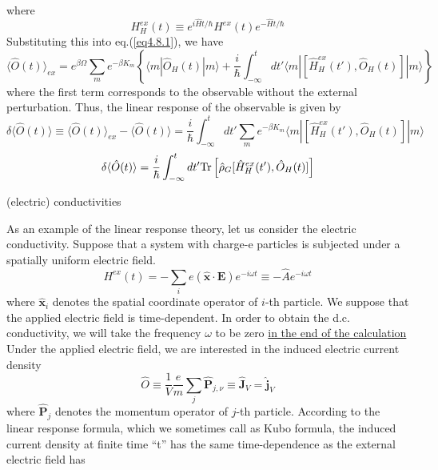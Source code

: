 where
\begin{equation}
H_H^{ex}(t) \equiv e^{i\hat Ht/\hbar} H^{ex} (t) e^{-\hat H t/\hbar}
\end{equation}
 Substituting this into eq.(\ref{eq4.8.1}), we have
\[
\langle \hat O(t)\rangle_{ex}=e^{\beta\Omega} \sum_m e^{-\beta K_m} \left\{ \langle m|\hat O_H(t)|m\rangle+\frac{i}{\hbar} \int_{-\infty}^t dt' \langle m|[\hat H_H^{ex}(t'),\hat O_H(t)]|m\rangle \right\}
\]
where the first term corresponds to the observable without the external perturbation.
 Thus, the linear response of the observable is given by 
\[
\delta\langle\hat O(t)\rangle\equiv \langle \hat O(t)\rangle_{ex}-\langle \hat O(t)\rangle=\frac{i}{\hbar} \int_{-\infty}^t dt' \sum_m e^{-\beta K_m} \langle m|[\hat H_H^{ex}(t'),\hat O_H(t)]|m\rangle
\]
\begin{equation}\label{eq4.8.5}
\delta\langle\hat O(t)\rangle = \frac{i}{\hbar} \int_{-\infty}^t dt'\text{Tr} \left[ \hat \rho _G [\hat H_H^{ex}(t'),\hat O_H(t)]\right]
\end{equation}
\begin{center}
(electric) conductivities
\end{center}
 As an example of the linear response theory, let us consider the electric conductivity.
 Suppose that a system with charge-e particles is subjected under a spatially uniform electric field.
\begin{equation}
H^{ex}(t)=-\sum_i e(\hat{\mathbf{x}}\cdot \mathbf E) e^{-i\omega t}\equiv -\hat Ae^{-i\omega t}
\end{equation}
where $\hat {\mathbf{x}}_i$ denotes the spatial coordinate operator of $i$-th particle.
 We suppose that the applied electric field is time-dependent.
 In order to obtain the d.c. conductivity, we will take the frequency $\omega$ to be zero \uline{in the end of the calculation}
 Under the applied electric field, we are interested in the induced electric current density
\begin{equation}
\hat O\equiv \frac{1}{V} \frac{e}{m} \sum_j \hat{\mathbf{P}}_{j,\nu} \equiv \hat{\mathbf{J}}_V=\hat{\mathbf{j}}_V
\end{equation} 
where $\hat{\mathbf{P}}_j$ denotes the momentum operator of $j$-th particle.
 According to the linear response formula, which we sometimes call as Kubo formula, the induced current density at finite time ``t'' has the same time-dependence as the external electric field has
